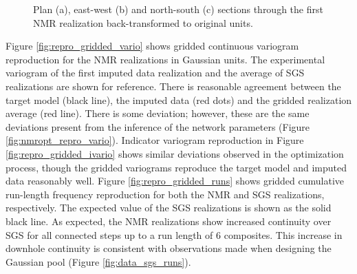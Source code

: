 \begin{figure}
    \centering
    \tabskip=0pt
    \caption{Plan (a), east-west (b) and north-south (c) sections through the first \gls{NMR} realization back-transformed to original units.}
    \label{fig:orig_reals}
\end{figure}


Figure \ref{fig:repro_gridded_vario} shows gridded continuous variogram reproduction for the \gls{NMR} realizations in Gaussian units. The experimental variogram of the first imputed data realization and the average of \gls{SGS} realizations are shown for reference. There is reasonable agreement between the target model (black line), the imputed data (red dots) and the gridded realization average (red line). There is some deviation; however, these are the same deviations present from the inference of the network parameters (Figure \ref{fig:nmropt_repro_vario}). Indicator variogram reproduction in Figure \ref{fig:repro_gridded_ivario} shows similar deviations observed in the optimization process, though the gridded variograms reproduce the target model and imputed data reasonably well. Figure \ref{fig:repro_gridded_runs} shows gridded cumulative run-length frequency reproduction for both the \gls{NMR} and \gls{SGS} realizations, respectively. The expected value of the \gls{SGS} realizations is shown as the solid black line. As expected, the \gls{NMR} realizations show increased continuity over \gls{SGS} for all connected steps up to a run length of 6 composites. This increase in downhole continuity is consistent with observations made when designing the Gaussian pool (Figure \ref{fig:data_sgs_runs}).

